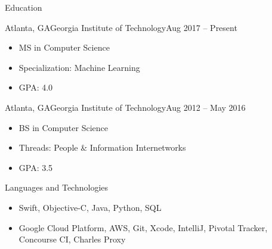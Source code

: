 \documentclass[]{mcdowellcv}
\begin{document}
	\makeheader
	
	\begin{cvsection}{Education}
		\begin{cvsubsection}{Atlanta, GA}{Georgia Institute of Technology}{Aug 2017 -- Present}
			\begin{itemize}
				\item MS in Computer Science
				\item Specialization: Machine Learning
				\item GPA: 4.0
			\end{itemize}
		\end{cvsubsection}
		\begin{cvsubsection}{Atlanta, GA}{Georgia Institute of Technology}{Aug 2012 -- May 2016}
			\begin{itemize}
				\item BS in Computer Science
				\item Threads: People \& Information Internetworks
				\item GPA: 3.5
			\end{itemize}
		\end{cvsubsection}
	\end{cvsection}

	\begin{cvsection}{Languages and Technologies}
		\begin{cvsubsection}{}{}{}	
			\begin{itemize}
				\item Swift, Objective-C, Java, Python, SQL
				\item Google Cloud Platform, AWS, Git, Xcode, IntelliJ, Pivotal Tracker, Concourse CI, Charles Proxy
			\end{itemize}
		\end{cvsubsection}
	\end{cvsection}
	
\end{document}
